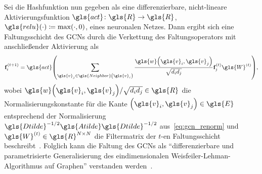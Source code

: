 Sei die Hashfunktion nun gegeben als eine differenzierbare, nicht-lineare Aktivierungsfunktion $\gls{act} \colon \gls{R} \to \gls{R}$, \bspw{} $\gls{relu}\left(\cdot\right) \coloneqq \max\left(\cdot, 0\right)$, eines neuronalen Netzes.
Dann ergibt sich eine Faltungsschicht des \glspl{GCN} durch die Verkettung des Faltungsoperators mit anschließender Aktivierung als
\begin{equation*}
  \ve{f}^{\left(t+1\right)}_i = \gls{act}\left(\sum_{\gls{v}_j \in \gls{Neighbor}\left(\gls{v}_i\right)} \frac{\gls{w}\left(\gls{v}_i, \gls{v}_j\right)}{\sqrt{d_i d_j}} \ve{f}^{\left(t\right)}_j \gls{W}^{\left(t\right)} \right),
\end{equation*}
wobei $\gls{w}\left(\gls{v}_i, \gls{v}_j\right)/\sqrt{d_i d_j} \in \gls{R}$ die Normalisierungskonstante für die Kante $\left(\gls{v}_i, \gls{v}_j\right) \in \gls{E}$ entsprechend der Normalisierung $\gls{Dtilde}^{-1/2}\gls{Atilde}\gls{Dtilde}^{-1/2}$ aus~\eqref{eq:gcn_renorm} und $\gls{W}^{\left(t\right)} \in \gls{R}^{N \times N}$ die Filtermatrix der $t$-en Faltungsschicht beschreibt~\cite{gcn}.
Folglich kann die Faltung des \glspl{GCN} als \enquote{differenzierbare und parametrisierte Generalisierung des eindimensionalen Weisfeiler-Lehman-Algorithmus auf Graphen} verstanden werden~\cite{gcn}.

